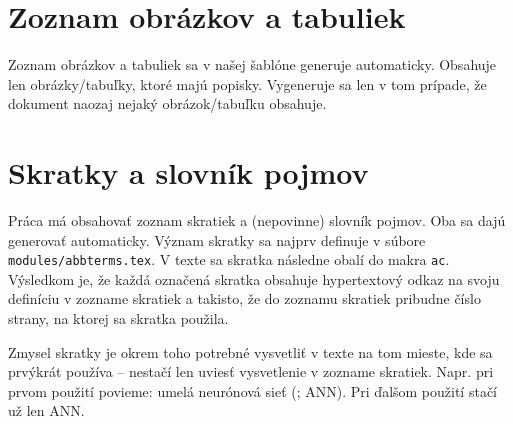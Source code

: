 
%
%
%
%
%
%
%
%
%
%
%


\section{Zoznam obrázkov a tabuliek}

Zoznam obrázkov a tabuliek sa v našej šablóne generuje automaticky. Obsahuje len obrázky/tabuľky, ktoré majú popisky. Vygeneruje sa len v tom prípade, že dokument naozaj nejaký obrázok/tabuľku obsahuje.

\section{Skratky a slovník pojmov}
\label{sec:skratky}

Práca má obsahovať zoznam skratiek a (nepovinne) slovník pojmov. Oba sa dajú generovať automaticky. Význam skratky sa najprv definuje v súbore \texttt{modules/abbterms.tex}. V texte sa skratka následne obalí do makra \texttt{ac}. Výsledkom je, že každá označená skratka obsahuje hypertextový odkaz na svoju definíciu v zozname skratiek a takisto, že do zoznamu skratiek pribudne číslo strany, na ktorej sa skratka použila.

Zmysel skratky je okrem toho potrebné vysvetliť v texte na tom mieste, kde sa prvýkrát používa -- nestačí len uviesť vysvetlenie v zozname skratiek. Napr. pri prvom použití povieme: umelá neurónová sieť (; \ac{ANN}). Pri ďalšom použití stačí už len \ac{ANN}.

